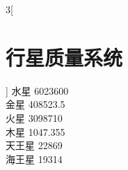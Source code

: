 \documentclass[a4paper]{article}
\begin{document}
\begin{multicols}{3}[\section*{行星质量系统}] \noindent
水星 6023600 \\ 金星 408523.5\\
火星 3098710 \\ 木星 1047.355\\
天王星 22869 \\ 海王星 19314
\end{multicols}
\end{document}
